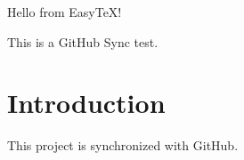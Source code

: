 \documentclass{article}
\begin{document}
Hello from EasyTeX!

This is a GitHub Sync test.

\section{Introduction}

This project is synchronized with GitHub.
\end{document}
